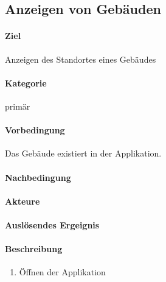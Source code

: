 \subsection{Anzeigen von Gebäuden}
\label{Anzeigen von Gebäuden}
\paragraph{Ziel}
Anzeigen des Standortes eines Gebäudes
\paragraph{Kategorie}
primär
\paragraph{Vorbedingung}
Das Gebäude existiert in der Applikation.
\paragraph{Nachbedingung}

\paragraph{Akteure}

\paragraph{Auslösendes Ergeignis}

\paragraph{Beschreibung}
\begin{enumerate}
    \item Öffnen der Applikation
\end{enumerate}